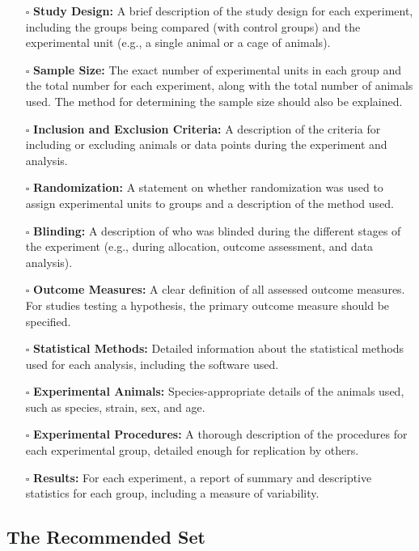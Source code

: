 \documentclass[11pt]{article}
\def\tightlist{}
\begin{document}
\begin{Form}
\begin{itemize}
\tightlist
\item[$\square$]
  \textbf{Study Design:} A brief description of the study design for
  each experiment, including the groups being compared (with control
  groups) and the experimental unit (e.g., a single animal or a cage of
  animals).
\item[$\square$]
  \textbf{Sample Size:} The exact number of experimental units in each
  group and the total number for each experiment, along with the total
  number of animals used. The method for determining the sample size
  should also be explained.
\item[$\square$]
  \textbf{Inclusion and Exclusion Criteria:} A description of the
  criteria for including or excluding animals or data points during the
  experiment and analysis.
\item[$\square$]
  \textbf{Randomization:} A statement on whether randomization was used
  to assign experimental units to groups and a description of the method
  used.
\item[$\square$]
  \textbf{Blinding:} A description of who was blinded during the
  different stages of the experiment (e.g., during allocation, outcome
  assessment, and data analysis).
\item[$\square$]
  \textbf{Outcome Measures:} A clear definition of all assessed outcome
  measures. For studies testing a hypothesis, the primary outcome
  measure should be specified.
\item[$\square$]
  \textbf{Statistical Methods:} Detailed information about the
  statistical methods used for each analysis, including the software
  used.
\item[$\square$]
  \textbf{Experimental Animals:} Species-appropriate details of the
  animals used, such as species, strain, sex, and age.
\item[$\square$]
  \textbf{Experimental Procedures:} A thorough description of the
  procedures for each experimental group, detailed enough for
  replication by others.
\item[$\square$]
  \textbf{Results:} For each experiment, a report of summary and
  descriptive statistics for each group, including a measure of
  variability.
\end{itemize}

\subsection{The Recommended Set}\label{the-recommended-set}


\end{Form}
\end{document}
